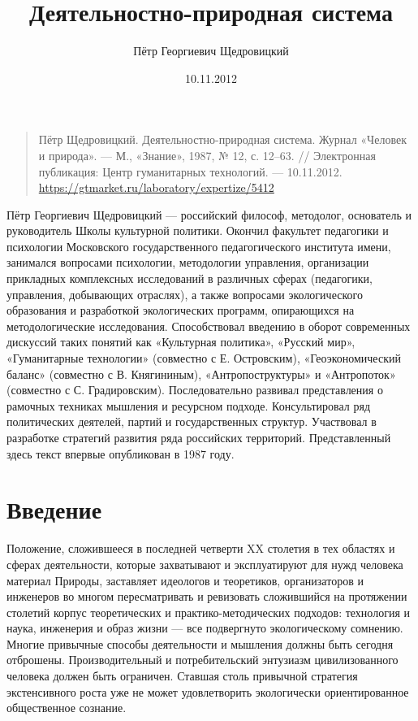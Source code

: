 \documentclass[11pt,a4paper]{article}
\title{Деятельностно-природная система}
\author{Пётр Георгиевич Щедровицкий}
\date{10.11.2012}
\begin{document}
\maketitle
\begin{quote}
  Пётр Щедровицкий. Деятельностно-природная система. Журнал «Человек и
  природа». — М., «Знание», 1987, № 12, с. 12–63. // Электронная публикация:
  Центр гуманитарных технологий. — 10.11.2012. \\
  \url{https://gtmarket.ru/laboratory/expertize/5412}
\end{quote}

\tableofcontents
\clearpage

Пётр Георгиевич Щедровицкий — российский философ, методолог, основатель и
руководитель Школы культурной политики. Окончил факультет педагогики и
психологии Московского государственного педагогического института имени,
занимался вопросами психологии, методологии управления, организации прикладных
комплексных исследований в различных сферах (педагогики, управления,
добывающих отраслях), а также вопросами экологического образования и
разработкой экологических программ, опирающихся на методологические
исследования.  Способствовал введению в оборот современных дискуссий таких
понятий как «Культурная политика», «Русский мир», «Гуманитарные технологии»
(совместно с Е. Островским), «Геоэкономический баланс» (совместно с
В. Княгининым), «Антропоструктуры» и «Антропоток» (совместно с
С. Градировским).  Последовательно развивал представления о рамочных техниках
мышления и ресурсном подходе. Консультировал ряд политических деятелей, партий
и государственных структур. Участвовал в разработке стратегий развития ряда
российских территорий. Представленный здесь текст впервые опубликован в 1987
году.

\section{Введение}

Положение, сложившееся в последней четверти XX столетия в тех областях и
сферах деятельности, которые захватывают и эксплуатируют для нужд человека
материал Природы, заставляет идеологов и теоретиков, организаторов и инженеров
во многом пересматривать и ревизовать сложившийся на протяжении столетий
корпус теоретических и практико-методических подходов: технология и наука,
инженерия и образ жизни — все подвергнуто экологическому сомнению. Многие
привычные способы деятельности и мышления должны быть сегодня отброшены.
Производительный и потребительский энтузиазм цивилизованного человека должен
быть ограничен. Ставшая столь привычной стратегия экстенсивного роста уже не
может удовлетворить экологически ориентированное общественное сознание.
\end{document}
